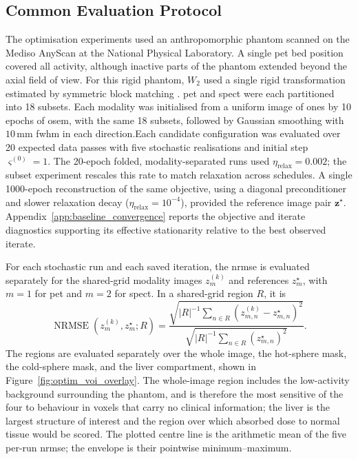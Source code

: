 \subsection{Common Evaluation Protocol}
\label{subsec:optimisation_evaluation_protocol}

The optimisation experiments used an anthropomorphic phantom scanned on the Mediso AnyScan at the National Physical Laboratory. A single \gls{pet} bed position covered all activity, although inactive parts of the phantom extended beyond the axial field of view. For this rigid phantom, $W_2$ used a single rigid transformation estimated by symmetric block matching \cite{modatGlobalImageRegistration2014}. \gls{pet} and \gls{spect} were each partitioned into 18 subsets. Each modality was initialised from a uniform image of ones by 10 epochs of \gls{osem}, with the same 18 subsets, followed by Gaussian smoothing with $10\,\mathrm{mm}$ \gls{fwhm} in each direction.Each candidate configuration was evaluated over 20 expected data passes with five stochastic realisations and initial step $\varsigma^{(0)}=1$. The 20-epoch folded, modality-separated runs used $\eta_{\mathrm{relax}}=0.002$; the subset experiment rescales this rate to match relaxation across schedules. A single 1000-epoch reconstruction of the same objective, using a diagonal preconditioner and slower relaxation decay ($\eta_{\mathrm{relax}}=10^{-4}$), provided the reference image pair $\bm z^\star$. Appendix~\ref{app:baseline_convergence} reports the objective and iterate diagnostics supporting its effective stationarity relative to the best observed iterate.

For each stochastic run and each saved iteration, the \acrfull{nrmse} is evaluated separately for the shared-grid modality images $z_m^{(k)}$ and references $z_m^\star$, with $m=1$ for \gls{pet} and $m=2$ for \gls{spect}. In a shared-grid region $R$, it is
\begin{equation}
    \operatorname{NRMSE}(z_m^{(k)},z_m^\star;R)
    =
    \frac{\sqrt{|R|^{-1}\sum_{n\in R}(z^{(k)}_{m,n}-z^\star_{m,n})^2}}
         {\sqrt{|R|^{-1}\sum_{n\in R}(z^\star_{m,n})^2}}.
    \label{eq:optimisation_nrmse}
\end{equation}
The regions are evaluated separately over the whole image, the hot-sphere mask, the cold-sphere mask, and the liver compartment, shown in Figure~\ref{fig:optim_voi_overlay}. The whole-image region includes the low-activity background surrounding the phantom, and is therefore the most sensitive of the four to behaviour in voxels that carry no clinical information; the liver is the largest structure of interest and the region over which absorbed dose to normal tissue would be scored. The plotted centre line is the arithmetic mean of the five per-run \gls{nrmse}; the envelope is their pointwise minimum--maximum.

